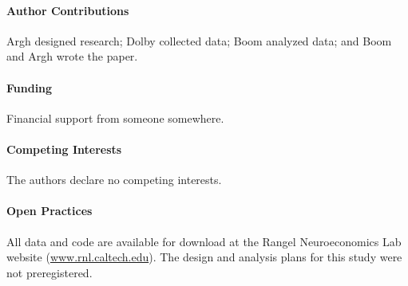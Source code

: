 \paragraph{Author Contributions}
Argh designed research; Dolby collected data; Boom analyzed data; and Boom and Argh wrote the paper.

\paragraph{Funding}
Financial support from someone somewhere.

\paragraph{Competing Interests}
The authors declare no competing interests.

\paragraph{Open Practices}
 All data and code are available for download at the Rangel Neuroeconomics Lab website (\url{www.rnl.caltech.edu}).
The design and analysis plans for this study were not preregistered.